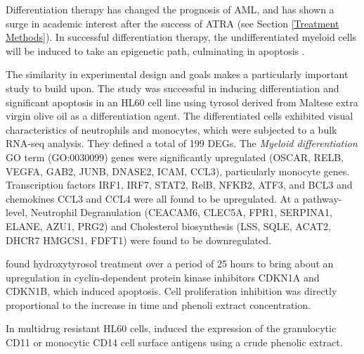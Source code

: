 Differentiation therapy has changed the prognosis of \ac{AML}, and has shown a surge in academic interest after the success of \ac{ATRA} (see Section \ref{Treatment Methods}). In successful differentiation therapy, the undifferentiated myeloid cells will be induced to take an epigenetic path, culminating in apoptosis \citep{santos2000expression, mark2017transcriptomes}. 

The similarity in experimental design and goals makes \cite{gatt2021tyrosol} a particularly important study to build upon. The study was successful in inducing differentiation and significant apoptosis in an HL60 cell line using tyrosol derived from Maltese extra virgin olive oil as a differentiation agent. The differentiated cells exhibited visual characteristics of neutrophils and monocytes, which were subjected to a bulk RNA-seq analysis. They defined a total of 199 \ac{DEG}s. The \textit{Myeloid differentiation} \ac{GO} term (\ac{GO}:0030099) genes were significantly upregulated (OSCAR, RELB, VEGFA, GAB2, JUNB, DNASE2, ICAM, CCL3), particularly monocyte genes. Transcription factors IRF1, IRF7, STAT2, RelB, NFKB2, ATF3, and BCL3 and chemokines CCL3 and CCL4 were all found to be upregulated. At a pathway-level, Neutrophil Degranulation (CEACAM6, CLEC5A, FPR1, SERPINA1, ELANE, AZU1, PRG2) and Cholesterol biosynthesis (LSS, SQLE, ACAT2, DHCR7 HMGCS1, FDFT1) were found to be downregulated.

\cite{fabiani2008inhibition} found hydroxytyrosol treatment over a period of 25 hours to bring about an upregulation in cyclin-dependent protein kinase inhibitors CDKN1A and CDKN1B, which induced apoptosis. Cell proliferation inhibition was directly proportional to the increase in time and phenoli extract concentration.

In multidrug resistant HL60 cells, \cite{crescimanno2009effects} induced the expression of the granulocytic CD11 or monocytic CD14 cell surface antigens using a crude phenolic extract.



